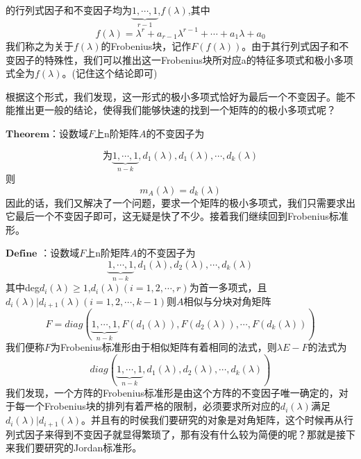 \documentclass[a4paper,12pt]{book}
\begin{document}
的行列式因子和不变因子均为$\underset{r-1}{\underbrace{1,\cdots ,1} } $,$\mathit{f(\lambda)}$,其中
\begin{equation*}
	\mathit{f(\lambda)}=\lambda^{r}+a_{r-1}\lambda^{r-1}+\cdots+a_{1}\lambda+a_{0}
\end{equation*}
我们称之为关于$\mathit{f(\lambda)}$的Frobenius块，记作$\mathit{F(f(\lambda))}$。由于其行列式因子和不变因子的特殊性，我们可以推出这一Frobenius块所对应a的特征多项式和极小多项式全为$\mathit{f(\lambda)}$。(记住这个结论即可)

根据这个形式，我们发现，这一形式的极小多项式恰好为最后一个不变因子。能不能推出更一般的结论，使得我们能够快速的找到一个矩阵的的极小多项式呢？

$\mathbf{Theorem}$：设数域$\mathit{F}$上n阶矩阵$\mathit{A}$的不变因子为

\begin{equation*}
	为\underset{n-k}{\underbrace{1,\cdots ,1} }, d_{1}(\lambda ),d_{1}(\lambda ),\cdots,d_{k}(\lambda )
\end{equation*}
则
\begin{equation*}
	m_{\mathit{A}}(\lambda)=d_{k}(\lambda )
\end{equation*}
因此的话，我们又解决了一个问题，要求一个矩阵的极小多项式，我们只需要求出它最后一个不变因子即可，这无疑是快了不少。接着我们继续回到Frobenius标准形。

$\mathbf{Define}$ ：设数域$\mathit{F}$上n阶矩阵$\mathit{A}$的不变因子为
\begin{equation*}
	\underset{n-k}{\underbrace{1,\cdots ,1} }, d_{1}(\lambda ),d_{2}(\lambda ),\cdots,d_{k}(\lambda )
\end{equation*}
其中deg$d_{i}(\lambda )\ge 1$,$d_{i}(\lambda )(i=1,2,\cdots,r)$为首一多项式，且$d_{i}(\lambda )|d_{i+1}(\lambda )(i=1,2,\cdots,k-1)$则$\mathit{A}$相似与分块对角矩阵
\begin{equation*}
	F=diag(\underset{n-k}{\underbrace{1,\cdots ,1} }, F(d_{1}(\lambda )),F(d_{2}(\lambda )),\cdots,F(d_{k}(\lambda )))
\end{equation*}
我们便称$\mathit{F}$为Frobenius标准形由于相似矩阵有着相同的法式，则$\mathit{\lambda E-F}$的法式为
\begin{equation*}
	diag(\underset{n-k}{\underbrace{1,\cdots ,1} }, d_{1}(\lambda ),d_{2}(\lambda ),\cdots,d_{k}(\lambda ))
\end{equation*}
我们发现，一个方阵的Frobenius标准形是由这个方阵的不变因子唯一确定的，对于每一个Frobenius块的排列有着严格的限制，必须要求所对应的$d_{i}(\lambda )$满足$d_{i}(\lambda )|d_{i+1}(\lambda )。$并且有的时侯我们要研究的对象是对角矩阵，这个时候再从行列式因子来得到不变因子就显得繁琐了，那有没有什么较为简便的呢？那就是接下来我们要研究的Jordan标准形。
\end{document}

